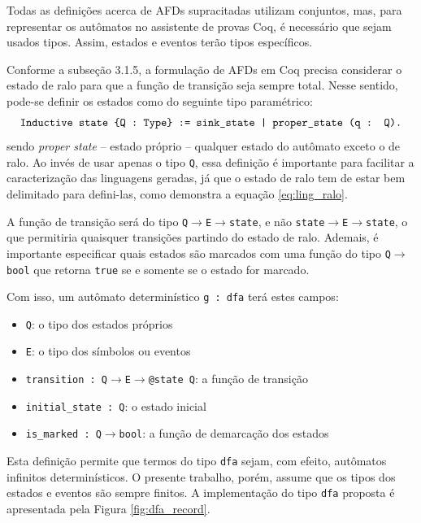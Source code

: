 Todas as definições acerca de AFDs supracitadas utilizam conjuntos, mas, para representar os autômatos no assistente de provas Coq, é necessário que sejam usados tipos. Assim, estados e eventos terão tipos específicos.

Conforme a subseção 3.1.5, a formulação de AFDs em Coq precisa considerar o estado de ralo para que a função de transição seja sempre total. Nesse sentido, pode-se definir os estados como do seguinte tipo paramétrico: $$\text{\texttt{Inductive state \{Q : Type\} := sink\_state | proper\_state (q : Q).}}$$ sendo \textit{proper state} -- estado próprio -- qualquer estado do autômato exceto o de ralo. Ao invés de usar apenas o tipo \texttt{Q}, essa definição é importante para facilitar a caracterização das linguagens geradas, já que o estado de ralo tem de estar bem delimitado para defini-las, como demonstra a equação \ref{eq:ling_ralo}.

A função de transição será do tipo \texttt{Q$\to$E$\to$state}, e não \texttt{state$\to$E$\to$state}, o que permitiria quaisquer transições partindo do estado de ralo. Ademais, é importante especificar quais estados são marcados com uma função do tipo \texttt{Q$\to$bool} que retorna \texttt{true} se e somente se o estado for marcado.

Com isso, um autômato determinístico \texttt{g : dfa} terá estes campos: \begin{itemize}
	\item \texttt{Q}: o tipo dos estados próprios
	\item \texttt{E}: o tipo dos símbolos ou eventos
	\item  \texttt{transition : Q$\to$E$\to$@state Q}: a função de transição
	\item \texttt{initial\_state : Q}: o estado inicial
	\item \texttt{is\_marked : Q$\to$bool}: a função de demarcação dos estados
\end{itemize}

Esta definição permite que termos do tipo \texttt{dfa} sejam, com efeito, autômatos infinitos determinísticos. O presente trabalho, porém, assume que os tipos dos estados e eventos são sempre finitos. A implementação do tipo \texttt{dfa} proposta é apresentada pela Figura \ref{fig:dfa_record}.


